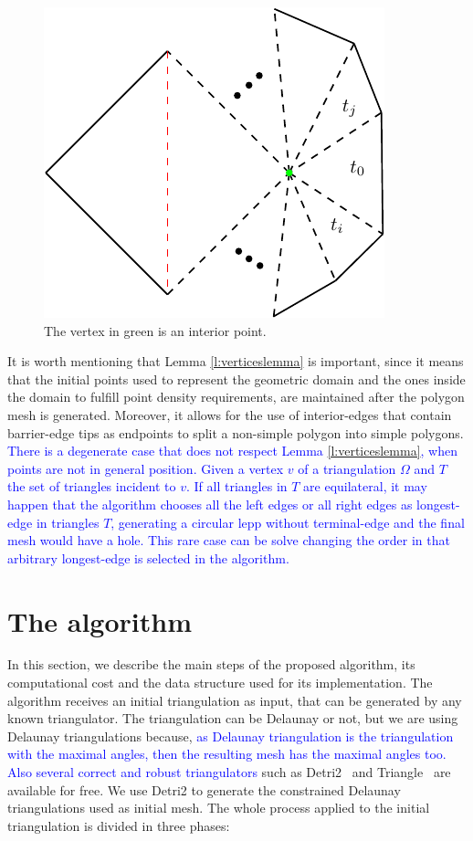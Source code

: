 \begin{figure}[h]
\centering
\includegraphics[width=0.25\linewidth]{demostracionlemma2.1} 
\caption{The  vertex in green is an interior point.}
\label{fig:lemmaquitadomingos}    
\end{figure}


It is worth mentioning that Lemma \ref{l:verticeslemma} is important, since it means that the initial points used to represent the geometric domain and the ones inside the domain to fulfill point density requirements, are maintained after the polygon mesh is generated. Moreover, it allows for the use of interior-edges that contain barrier-edge tips as endpoints to split a non-simple polygon into simple polygons.
\newpage
\textcolor{blue}{There is a degenerate case that does not respect Lemma \ref{l:verticeslemma}, when points are not in general position. Given a vertex $v$ of a triangulation $\Omega$ and $T$ the set of triangles incident to $v$. If all triangles in $T$ are equilateral, it may happen that the algorithm chooses all the left edges or all right edges as longest-edge in triangles $T$, generating a circular lepp without terminal-edge and the final mesh would have a hole. This rare case can be solve changing the order in that arbitrary longest-edge is selected in the algorithm.}


\section{The algorithm}
\label{sec:the_algorithm}


In this section, we describe  the main steps of the proposed algorithm, its computational cost  and the data structure used for its implementation.
The algorithm receives an initial triangulation as input, that can be generated by any known triangulator. The triangulation can be Delaunay or not, but we are using Delaunay triangulations because, \textcolor{blue}{ as Delaunay triangulation is the triangulation with the maximal angles, then the resulting mesh has the maximal angles too. Also several correct and robust triangulators} such as Detri2~\cite{Detri2} and Triangle~\cite{Shewchuktriangle} are available for free.  We use Detri2 \cite{Detri2} to generate the constrained Delaunay triangulations used as initial mesh. The whole process applied to the initial triangulation is divided in three phases:



